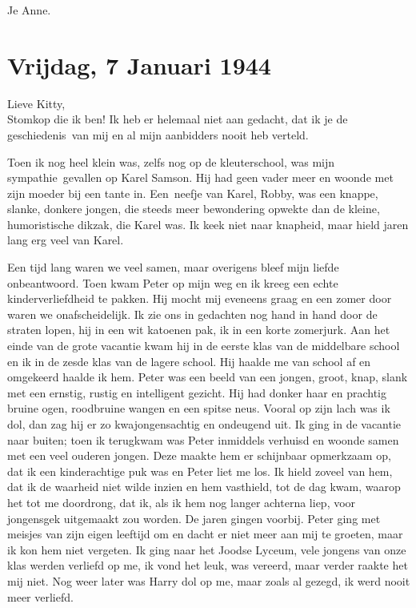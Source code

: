 \documentclass{book}
\begin{document}
Je Anne.

\chapter{Vrijdag, 7 Januari 1944}

Lieve Kitty,\\Stomkop die ik ben! Ik heb er helemaal niet aan gedacht,
dat ik je de geschiedenis~van mij en al mijn aanbidders nooit heb
verteld.

Toen ik nog heel klein was, zelfs nog op de kleuterschool, was mijn
sympathie~gevallen op Karel Samson. Hij had geen vader meer en woonde
met zijn moeder bij een tante in. Een~neefje van Karel, Robby, was een
knappe, slanke, donkere jongen, die steeds meer bewondering opwekte dan
de kleine, humoristische dikzak, die Karel was. Ik keek niet naar
knapheid, maar hield jaren lang erg veel van Karel.

Een tijd lang waren we veel samen, maar overigens bleef mijn liefde
onbeantwoord. Toen kwam Peter op mijn weg en ik kreeg een echte
kinderverliefdheid te pakken. Hij mocht mij eveneens graag en een zomer
door waren we onafscheidelijk. Ik zie ons in gedachten nog hand in hand
door de straten lopen, hij in een wit katoenen pak, ik in een korte
zomerjurk. Aan het einde van de grote vacantie kwam hij in de eerste
klas van de middelbare school en ik in de zesde klas van de lagere
school. Hij haalde me van school af en omgekeerd haalde ik hem. Peter
was een beeld van een jongen, groot, knap, slank met een ernstig, rustig
en intelligent gezicht. Hij had donker haar en prachtig bruine ogen,
roodbruine wangen en een spitse neus. Vooral op zijn lach was ik dol,
dan zag hij er zo kwajongensachtig en ondeugend uit. Ik ging in de
vacantie naar buiten; toen ik terugkwam was Peter inmiddels verhuisd en
woonde samen met een veel ouderen jongen. Deze maakte hem er schijnbaar
opmerkzaam op, dat ik een kinderachtige puk was en Peter liet me los. Ik
hield zoveel van hem, dat ik de waarheid niet wilde inzien en hem
vasthield, tot de dag kwam, waarop het tot me doordrong, dat ik, als ik
hem nog langer achterna liep, voor jongensgek uitgemaakt zou worden. De
jaren gingen voorbij. Peter ging met meisjes van zijn eigen leeftijd om
en dacht er niet meer aan mij te groeten, maar ik kon hem niet vergeten.
Ik ging naar het Joodse Lyceum, vele jongens van onze klas werden
verliefd op me, ik vond het leuk, was vereerd, maar verder raakte het
mij niet. Nog weer later was Harry dol op me, maar zoals al gezegd, ik
werd nooit meer verliefd.
\end{document}
